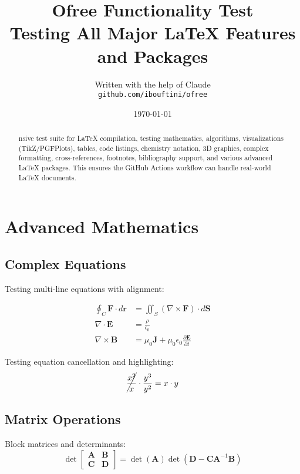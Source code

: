 \documentclass[11pt,a4paper]{article}
\title{\Huge \textbf{Ofree Functionality Test}\\[0.5cm]
\Large Testing All Major LaTeX Features and Packages}
\author{Written with the help of Claude\\[0.2cm]
\texttt{github.com/ibouftini/ofree}}
\date{\today}
\theoremstyle{definition}
\begin{document}
\maketitle

\begin{abstract}
nsive test suite for LaTeX compilation, testing mathematics, algorithms, visualizations (TikZ/PGFPlots), tables, code listings, chemistry notation, 3D graphics, complex formatting, cross-references, footnotes, bibliography support, and various advanced LaTeX packages. This ensures the GitHub Actions workflow can handle real-world LaTeX documents.
\end{abstract}

\tableofcontents
\listoffigures
\listoftables
\newpage

\section{Advanced Mathematics}

\subsection{Complex Equations}

Testing multi-line equations with alignment:

\begin{align}
    \oint_C \mathbf{F} \cdot d\mathbf{r} &= \iint_S (\nabla \times \mathbf{F}) \cdot d\mathbf{S} \label{eq:stokes} \\
    \nabla \cdot \mathbf{E} &= \frac{\rho}{\epsilon_0} \label{eq:gauss} \\
    \nabla \times \mathbf{B} &= \mu_0\mathbf{J} + \mu_0\epsilon_0\frac{\partial \mathbf{E}}{\partial t} \label{eq:ampere}
\end{align}

Testing equation cancellation and highlighting:
\begin{equation}
    \cancel{\frac{x^2}{x}} \cdot \frac{y^3}{y^2} = x \cdot y
\end{equation}

\subsection{Matrix Operations}

Block matrices and determinants:
\begin{equation}
    \det\begin{bmatrix}
        \mathbf{A} & \mathbf{B} \\
        \mathbf{C} & \mathbf{D}
    \end{bmatrix} = \det(\mathbf{A})\det(\mathbf{D} - \mathbf{C}\mathbf{A}^{-1}\mathbf{B})
\end{equation}
\end{document}
